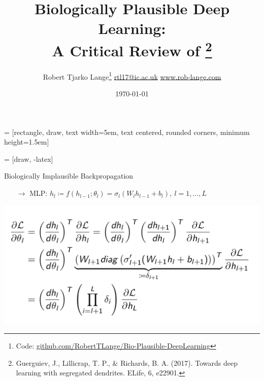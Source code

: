 \documentclass[dvipsnames, usenames]{beamer}
\begin{document}

 = [rectangle, draw, 
    text width=5em, text centered, rounded corners, minimum height=1.5em]
    
 = [draw, -latex]

\title{Biologically Plausible Deep Learning: \\ A Critical Review of \citet{guerguiev2017} \thanks{Guerguiev, J., Lillicrap, T. P., \& Richards, B. A. (2017). Towards deep learning with segregated dendrites. ELife, 6, e22901.}}
\subtitle{}

\author{\texorpdfstring{Robert Tjarko Lange\thanks{Code: \url{github.com/RobertTLange/Bio-Plausible-DeepLearning}}
						\newline\url{rtl17@ic.ac.uk}
						\newline\url{www.rob-lange.com}
	}
	{Author}}


\date{\today}



\begin{frame}[noframenumbering]

\titlepage
\end{frame}

\begin{frame}{Biologically Implausible Backpropagation}

\begin{itemize}
	\item[$\rightarrow$] MLP: $h_l \coloneqq f(h_{l-1}; \theta_l) = \sigma_l (W_l h_{l-1} + b_l), \ l=1,\dots, L$
\end{itemize}
\pause
\centering
\includegraphics[width=1.1\textwidth]{../figures/report/backprop_1}

\end{frame}
\end{document}
